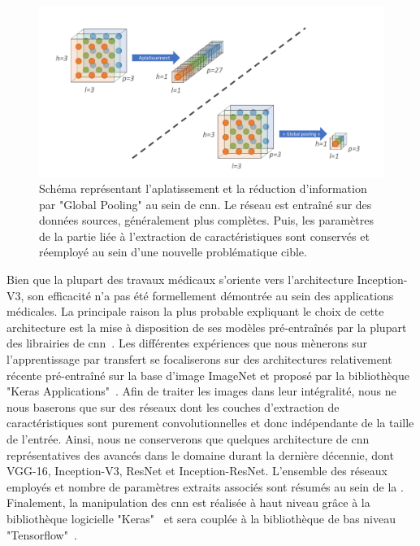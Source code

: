 \begin{figure}[H]
    \centering
    \includegraphics[width=\linewidth]{contents/chapter_4/resources/scheme_global_pooling.pdf}
    \caption{Schéma représentant l'aplatissement et la réduction d'information par "Global Pooling" au sein de \gls{cnn}. Le réseau est entraîné sur des données sources, généralement plus complètes. Puis, les paramètres de la partie liée à l'extraction de caractéristiques sont conservés et réemployé au sein d'une nouvelle problématique cible.}
    \label{fig:scheme_global_pooling}
\end{figure}\par

Bien que la plupart des travaux médicaux s'oriente vers l'architecture Inception-V3, son efficacité n'a pas été formellement démontrée au sein des applications médicales. La principale raison la plus probable expliquant le choix de cette architecture est la mise à disposition de ses modèles pré-entraînés par la plupart des librairies de \gls{cnn}~\cite{Litjens2017}. Les différentes expériences que nous mènerons sur l'apprentissage par transfert se focaliserons sur des architectures relativement récente pré-entraîné sur la base d'image ImageNet et proposé par la bibliothèque "Keras Applications"~\cite{chollet2015a}. Afin de traiter les images dans leur intégralité, nous ne nous baserons que sur des réseaux dont les couches d'extraction de caractéristiques sont purement convolutionnelles et donc indépendante de la taille de l'entrée. Ainsi, nous ne conserverons que quelques architecture de \gls{cnn} représentatives des avancés dans le domaine durant la dernière décennie, dont VGG-16, Inception-V3, ResNet et Inception-ResNet. L'ensemble des réseaux employés et nombre de paramètres extraits associés sont résumés au sein de la . Finalement, la manipulation des \ac{cnn} est réalisée à haut niveau grâce à la bibliothèque logicielle "Keras"~\cite{chollet2015} et sera couplée à la bibliothèque de bas niveau "Tensorflow"~\cite{tensorflow2015}.\par

